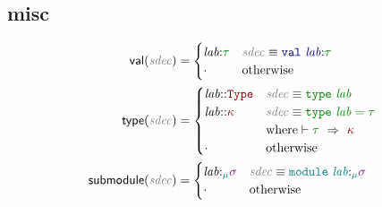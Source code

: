 \documentclass[10pt,fleqn]{article}
\newcommand{\red}[1]{\textcolor{red}{#1}}
\newcommand{\green}[1]{\textcolor{green}{#1}}
\newcommand{\blue}[1]{\textcolor{blue}{#1}}
\newcommand{\purple}[1]{\textcolor{purple}{#1}}
\newcommand{\teal}[1]{\textcolor{teal}{#1}}
\newcommand{\black}[1]{\textcolor{black}{#1}}
\newcommand{\grey}[1]{\textcolor{grey}{#1}}
\newcommand{\redtt}[1]{\red{\mathtt{#1}}}
\newcommand{\greentt}[1]{\green{\mathtt{#1}}}
\newcommand{\bluett}[1]{\blue{\mathtt{#1}}}
\newcommand{\tealtt}[1]{\teal{\mathtt{#1}}}
\newcommand{\redit}[1]{\red{\mathit{#1}}}
\newcommand{\greenit}[1]{\green{\mathit{#1}}}
\newcommand{\purpleit}[1]{\purple{\mathit{#1}}}
\newcommand{\tealit}[1]{\teal{\mathit{#1}}}
\newcommand{\greyit}[1]{\grey{\mathit{#1}}}
\newcommand{\knd}[1][]{\redit{\kappa#1}}
\newcommand{\typ}[1][]{\greenit{\tau#1}}
\newcommand{\sig}[1][]{\purpleit{\sigma#1}}
\renewcommand{\mod}[1][]{\tealit{\mu#1}}
\newcommand{\lab}[1][]{\mathit{lab#1}}
\newcommand{\Type}{\redtt{Type}}
\newcommand{\sdec}[1][]{\greyit{sdec#1}}
\newcommand{\OpaqueTypeSdec}[1]{\greentt{type~#1}}
\newcommand{\TransparentTypeSdec}[2]{\greentt{type~#1 = #2}}
\newcommand{\ValSdec}[2]{\bluett{val~#1\TypAnn #2}}
\newcommand{\ModSdec}[2]{\tealtt{module~#1\SigAnn #2}}
\newcommand{\val}[1]{\mathsf{val(}#1\mathsf{)}}
\newcommand{\type}[1]{\mathsf{type(}#1\mathsf{)}}
\newcommand{\submodule}[1]{\mathsf{submodule(}#1\mathsf{)}}
\newcommand{\TypAssump}{\black{:}}
\newcommand{\TypAnn}{\black{:}}
\newcommand{\KndAssump}{\black{::}}
\newcommand{\SigAssump}{\black{:_{\mod}}}
\newcommand{\SigAnn}{\black{:_{\mod}}}
\newcommand{\Syn}[3]{#1 \vdash #2~\Rightarrow~#3}
\begin{document}
\subsection*{misc}
\begin{align*}
    \val{\sdec} &=
    \begin{cases}
        \lab\TypAssump\typ & \sdec \equiv \ValSdec{\lab}{\typ} \\
        \cdot & \textrm{otherwise} \\
    \end{cases} \\
    \type{\sdec} &=
    \begin{cases}
        \lab\KndAssump\Type & \sdec \equiv \OpaqueTypeSdec{\lab} \\
        \lab\KndAssump\knd & \sdec \equiv \TransparentTypeSdec{\lab}{\typ} \\
                           & \textrm{where} \Syn{}{\typ}{\knd}\\
        \cdot & \textrm{otherwise} \\
    \end{cases} \\
    \submodule{\sdec} &=
    \begin{cases}
        \lab\SigAssump\sig & \sdec \equiv \ModSdec{\lab}{\sig} \\
        \cdot & \textrm{otherwise} \\
    \end{cases} \\
\end{align*}
\end{document}
